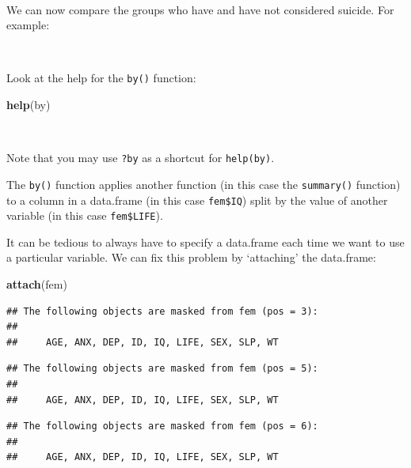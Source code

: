 \documentclass[12pt,a4paper]{book}
\newenvironment{Shaded}{\begin{snugshade}}{\end{snugshade}}
\newcommand{\KeywordTok}[1]{\textcolor[rgb]{0.13,0.29,0.53}{\textbf{#1}}}
\newcommand{\OperatorTok}[1]{\textcolor[rgb]{0.81,0.36,0.00}{\textbf{#1}}}
\newcommand{\NormalTok}[1]{#1}
\theoremstyle{definition}
\theoremstyle{definition}
\theoremstyle{definition}
\theoremstyle{remark}
\begin{document}
~

We can now compare the groups who have and have not considered suicide.
For example:

\begin{Shaded}
\end{Shaded}

~

Look at the help for the \texttt{by()} function:

\begin{Shaded}
\begin{Highlighting}[]
\KeywordTok{help}\NormalTok{(by)}
\end{Highlighting}
\end{Shaded}

~

Note that you may use \texttt{?by} as a shortcut for \texttt{help(by)}.

The \texttt{by()} function applies another function (in this case the
\texttt{summary()} function) to a column in a data.frame (in this case
\texttt{fem\$IQ}) split by the value of another variable (in this case
\texttt{fem\$LIFE}).

It can be tedious to always have to specify a data.frame each time we
want to use a particular variable. We can fix this problem by
`attaching' the data.frame:

\begin{Shaded}
\begin{Highlighting}[]
\KeywordTok{attach}\NormalTok{(fem)}
\end{Highlighting}
\end{Shaded}

\begin{verbatim}
## The following objects are masked from fem (pos = 3):
## 
##     AGE, ANX, DEP, ID, IQ, LIFE, SEX, SLP, WT
\end{verbatim}

\begin{verbatim}
## The following objects are masked from fem (pos = 5):
## 
##     AGE, ANX, DEP, ID, IQ, LIFE, SEX, SLP, WT
\end{verbatim}

\begin{verbatim}
## The following objects are masked from fem (pos = 6):
## 
##     AGE, ANX, DEP, ID, IQ, LIFE, SEX, SLP, WT
\end{verbatim}
\end{document}
